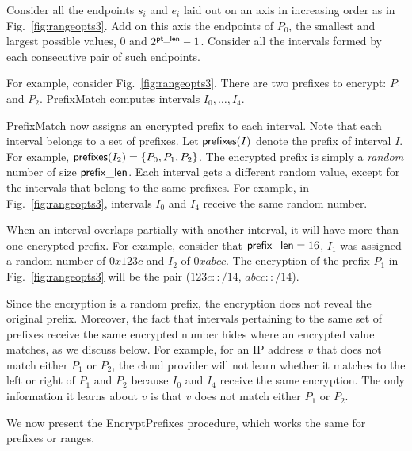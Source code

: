 Consider all the endpoints $s_i$ and $e_i$ laid out on an axis in increasing order as in Fig.~\ref{fig:rangeopts3}.
Add on this axis the endpoints of $P_0$, the smallest and largest possible values, $0$ and $2^{\mathsf{pt\_len}}-1$.
Consider all the intervals formed by each consecutive pair of such endpoints. 

For example, consider Fig.~\ref{fig:rangeopts3}.  There are two prefixes to encrypt: $P_1$ and $P_2$. PrefixMatch computes intervals $I_0, \dots, I_4$.

PrefixMatch now assigns an encrypted prefix to each interval. Note that each interval belongs to a set of prefixes. Let $\mathsf{prefixes}(I)$ denote the prefix of interval $I$. For example, $\mathsf{prefixes}(I_2) = \{P_0, P_1, P_2\}$. The encrypted prefix is simply a {\em random} number of size $\mathsf{prefix\_len}$. Each interval gets a different random value, except for the intervals that belong to the same prefixes. For example, in Fig.~\ref{fig:rangeopts3}, intervals $I_0$ and $I_4$ receive the same random number.

When an interval overlaps partially with another interval, it will have more than one encrypted prefix. For example, consider that $\mathsf{prefix\_len} = 16$, $I_1$ was assigned a random number of $0x123c$ and $I_2$ of $0xabcc$. The encryption of the prefix $P_1$ in Fig.~\ref{fig:rangeopts3} will be the pair ($123c::/14$, $abcc::/14$).

Since the encryption is a random prefix, the encryption does not reveal the original prefix. Moreover, the fact that intervals pertaining to the same set of prefixes receive the same encrypted number hides where an encrypted value matches, as we discuss below. For example, for an IP address $v$ that does not match either $P_1$ or $P_2$, the cloud provider will not learn whether it matches to the left or right of $P_1$ and $P_2$ because $I_0$ and $I_4$ receive the same encryption. The only information it learns about $v$ is that $v$ does not match either $P_1$ or $P_2$. 

We now present the EncryptPrefixes procedure, which works the same for prefixes or ranges.



